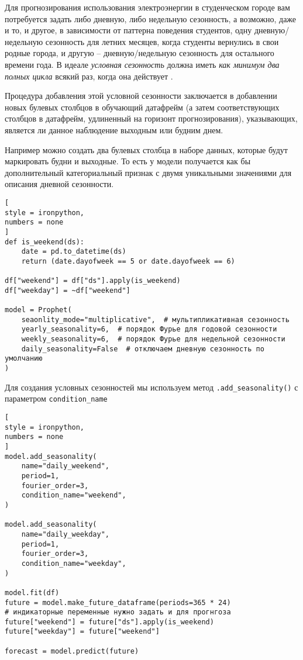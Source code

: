 \documentclass[%
	11pt,
	a4paper,
	utf8,
		]{article}
\begin{document}
Для прогнозирования использования электроэнергии в студенческом городе вам потребуется задать либо дневную, либо недельную сезонность, а возможно, даже и то, и другое, в зависимости от паттерна поведения студентов, одну дневную/недельную сезонность для летних месяцев, когда студенты вернулись в свои родные города, и другую -- дневную/недельную сезонность для остального времени года. В идеале \emph{условная сезонность} должна иметь \emph{как минимум два полных цикла} всякий раз, когда она действует \cite[]{gruzdev:time-series-2022}.

Процедура добавления этой условной сезонности заключается в добавлении новых булевых столбцов в обучающий датафрейм (а затем соответствующих столбцов в датафрейм, удлиненный на горизонт прогнозирования), указывающих, является ли данное наблюдение выходным или будним днем.

Например можно создать два булевых столбца в наборе данных, которые будут маркировать будни и выходные. То есть у модели получается как бы дополнительный категориальный признак с двумя уникальными значениями для описания дневной сезонности.

\begin{lstlisting}[
style = ironpython,
numbers = none
]
def is_weekend(ds):
    date = pd.to_datetime(ds)
    return (date.dayofweek == 5 or date.dayofweek == 6)
    
df["weekend"] = df["ds"].apply(is_weekend)
df["weekday"] = ~df["weekend"]

model = Prophet(
    seaonlity_mode="multiplicative",  # мультипликативная сезонность
    yearly_seasonality=6,  # порядок Фурье для годовой сезонности
    weekly_seasonality=6,  # порядок Фурье для недельной сезонности
    daily_seasonality=False  # отключаем дневную сезонность по умолчанию
)
\end{lstlisting}

Для создания условных сезонностей мы используем метод \verb|.add_seasonality()| с параметром \verb|condition_name|
\begin{lstlisting}[
style = ironpython,
numbers = none
]
model.add_seasonality(
    name="daily_weekend",
    period=1,
    fourier_order=3,
    condition_name="weekend",
)

model.add_seasonality(
    name="daily_weekday",
    period=1,
    fourier_order=3,
    condition_name="weekday",
)

model.fit(df)
future = model.make_future_dataframe(periods=365 * 24)
# индикаторные переменные нужно задать и для прогнгоза
future["weekend"] = future["ds"].apply(is_weekend)
future["weekday"] = future["weekend"]

forecast = model.predict(future)
\end{lstlisting}
\end{document}
